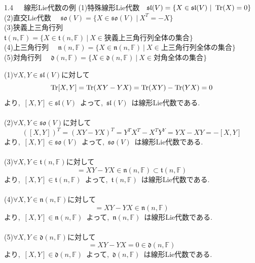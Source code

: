 \documentclass[uplatex,dvipdfmx]{jsarticle}
\begin{document}
\begin{myex}{1.4~~~線形Lie代数の例}
    (1)特殊線形Lie代数~~$\mathfrak{sl}(V)=\{X\in \mathfrak{sl}(V)~|~\Tr(X)=0\}$\\
    (2)直交Lie代数 ~~$\mathfrak{so}(V)=\{X\in \mathfrak{so}(V) ~|~X^T = -X\}$\\
    (3)狭義上三角行列 ~~$\mathfrak{t}(n,\mathbb{F})= \{ X\in \mathfrak{t}(n,\mathbb{F})~|~X\in \text{狭義上三角行列全体の集合}\}$\\
    (4)上三角行列 ~~$\mathfrak{n}(n,\mathbb{F})= \{ X\in \mathfrak{n}(n,\mathbb{F})~|~X\in \text{上三角行列全体の集合}\}$\\
    (5)対角行列 ~~$\mathfrak{d}(n,\mathbb{F})= \{ X\in \mathfrak{d}(n,\mathbb{F})~|~X\in \text{対角全体の集合}\}$
\end{myex}
\begin{myproof}
(1)$\forall X,Y\in \mathfrak{sl}(V)$に対して
\begin{equation*}
    \Tr[X,Y]=\Tr(XY-YX) = \Tr(XY)-\Tr(YX)=0
\end{equation*}
より,~$[X,Y]\in \mathfrak{sl}(V)$~よって,~$\mathfrak{sl}(V)$~は線形Lie代数である.\\\\
(2)$\forall X,Y\in \mathfrak{so}(V)$に対して
\begin{equation*}
    ([X,Y])^T = (XY-YX)^T = Y^TX^T -X^TY^Y =YX-XY= -[X,Y]
\end{equation*}
より,~$[X,Y]\in \mathfrak{so}(V)$~よって,~$\mathfrak{so}(V)$~は線形Lie代数である.\\\\
(3)$\forall X,Y\in \mathfrak{t}(n,\mathbb{F})$に対して
\begin{equation*}
    [X,Y]=XY-YX\in \mathfrak{n}(n,\mathbb{F})\subset\mathfrak{t}(n,\mathbb{F})
\end{equation*}
より,~$[X,Y]\in \mathfrak{t}(n,\mathbb{F})$~よって,~$\mathfrak{t}(n,\mathbb{F})$~は線形Lie代数である.\\\\
(4)$\forall X,Y\in \mathfrak{n}(n,\mathbb{F})$に対して
\begin{equation*}
    [X,Y]=XY-YX\in \mathfrak{n}(n,\mathbb{F})
\end{equation*}
より,~$[X,Y]\in \mathfrak{n}(n,\mathbb{F})$~よって,~$\mathfrak{n}(n,\mathbb{F})$~は線形Lie代数である.\\\\
(5)$\forall X,Y\in \mathfrak{d}(n,\mathbb{F})$に対して
\begin{equation*}
    [X,Y]=XY-YX=0\in \mathfrak{d}(n,\mathbb{F})
\end{equation*}
より,~$[X,Y]\in \mathfrak{d}(n,\mathbb{F})$~よって,~$\mathfrak{d}(n,\mathbb{F})$~は線形Lie代数である.
\end{myproof}
\newpage
\end{document}
